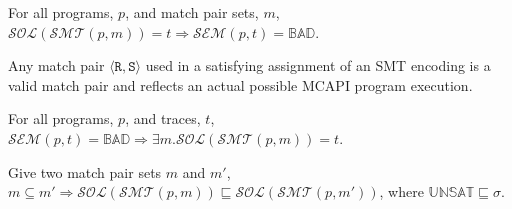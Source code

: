 \begin{theorem}[Soundness]
For all programs, $p$, and match pair sets, $m$,
$\mathcal{SOL}(\mathcal{SMT}(p, m)) = t \Rightarrow \mathcal{SEM}(p, t) =
\mathbb{BAD}$.
\end{theorem}


\begin{lemma} \label{lem:bogus}
Any match pair $\langle \mathtt{R}, \mathtt{S}\rangle$ used in a
satisfying assignment of an SMT encoding is a valid match pair and
reflects an actual possible MCAPI program execution.
\end{lemma}

\begin{theorem}[Completeness]
For all programs, $p$, and traces, $t$, $\mathcal{SEM}(p, t) =
\mathbb{BAD} \Rightarrow \exists m . \mathcal{SOL}(\mathcal{SMT}(p,
m)) = t$.
\end{theorem}

\begin{theorem}[Approximation]
Give two match pair sets $m$ and $m'$, $m \subseteq m' \Rightarrow \mathcal{SOL}(\mathcal{SMT}(p, m))
  \sqsubseteq \mathcal{SOL}(\mathcal{SMT}(p, m'))$, where
  $\mathbb{UNSAT} \sqsubseteq \sigma$.
\end{theorem}


 


